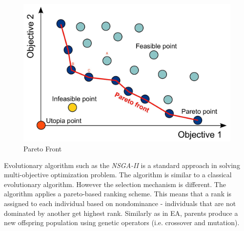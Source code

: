 \documentclass[format=acmsmall, review=false, screen=true]{acmart}
\begin{document}
\begin{figure}[H]
  \includegraphics[width=0.66\linewidth]{img/pareto_front.JPG}
  \caption{\label{fig:paretofront}Pareto Front}
\end{figure}

Evolutionary algorithm such as the \emph{NSGA-II}\cite{deb200fast} is a standard approach in solving multi-objective optimization problem. The algorithm is similar to a classical evolutionary algorithm. However the selection mechanism is different. The algorithm applies a pareto-based ranking scheme. This means that a rank is assigned to each individual based on nondominance - individuals that are not dominated by another get highest rank. Similarly as in EA, parents produce a new offspring population using genetic operators (i.e. crossover and mutation).
\end{document}
